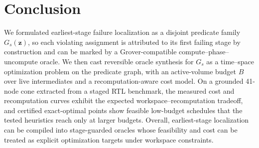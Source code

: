 \documentclass[conference]{IEEEtran}
\newcommand{\zvec}{\mathbf{z}}
\begin{document}
\section{Conclusion}
We formulated earliest-stage failure localization as a disjoint predicate family $G_s(\zvec)$, so each violating assignment is attributed to its first failing stage by construction and can be marked by a Grover-compatible compute--phase--uncompute oracle. We then cast reversible oracle synthesis for $G_s$ as a time--space optimization problem on the predicate graph, with an active-volume budget $B$ over live intermediates and a recomputation-aware cost model. On a grounded 41-node cone extracted from a staged RTL benchmark, the measured cost and recomputation curves exhibit the expected workspace--recomputation tradeoff, and certified exact-optimal points show feasible low-budget schedules that the tested heuristics reach only at larger budgets. Overall, earliest-stage localization can be compiled into stage-guarded oracles whose feasibility and cost can be treated as explicit optimization targets under workspace constraints.



\end{document}
